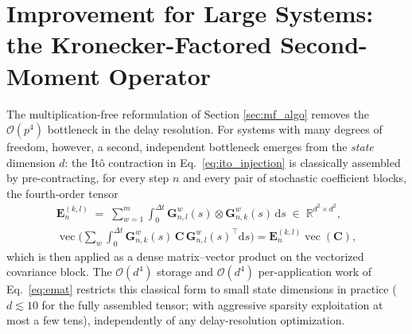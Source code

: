 \documentclass[preprint,12pt]{elsarticle}
\begin{document}
\section{Improvement for Large Systems: the Kronecker-Factored Second-Moment Operator}
\label{sec:kron}

The multiplication-free reformulation of Section \ref{sec:mf_algo} removes the $\mathcal{O}(p^4)$ bottleneck in the delay resolution. For systems with many degrees of freedom, however, a second, independent bottleneck emerges from the \emph{state} dimension $d$: the It\^o contraction in Eq.~\eqref{eq:ito_injection} is classically assembled by pre-contracting, for every step $n$ and every pair of stochastic coefficient blocks, the fourth-order tensor
\begin{equation}
\label{eq:emat}
\begin{gathered}
\mathbf{E}^{(k,l)}_n \;=\; \sum_{w=1}^{m}\int_0^{\Delta t} \mathbf{G}^w_{n,l}(s) \otimes \mathbf{G}^w_{n,k}(s)\, \mathrm{d}s \;\in\; \mathbb{R}^{d^2 \times d^2}, \\
\operatorname{vec}\!\Big(\textstyle\sum_w \int_0^{\Delta t} \mathbf{G}^w_{n,k}(s)\, \mathbf{C}\, \mathbf{G}^w_{n,l}(s)^\top \mathrm{d}s\Big) = \mathbf{E}^{(k,l)}_n \operatorname{vec}(\mathbf{C}),
\end{gathered}
\end{equation}
which is then applied as a dense matrix--vector product on the vectorized covariance block. The $\mathcal{O}(d^4)$ storage and $\mathcal{O}(d^4)$ per-application work of Eq.~\eqref{eq:emat} restricts this classical form to small state dimensions in practice ($d \lesssim 10$ for the fully assembled tensor; with aggressive sparsity exploitation at most a few tens), independently of any delay-resolution optimization.
\end{document}
